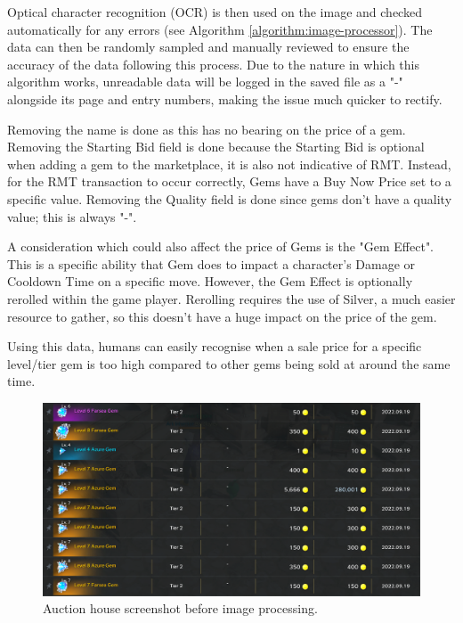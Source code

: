 \documentclass[journal]{IEEEtran}
\begin{document}
Optical character recognition (OCR) is then used on the image and checked automatically for any errors (see Algorithm \ref{algorithm:image-processor}). The data can then be randomly sampled and manually reviewed to ensure the accuracy of the data following this process. Due to the nature in which this algorithm works, unreadable data will be logged in the saved file as a "-" alongside its page and entry numbers, making the issue much quicker to rectify.

Removing the name is done as this has no bearing on the price of a gem. Removing the Starting Bid field is done because the Starting Bid is optional when adding a gem to the marketplace, it is also not indicative of RMT. Instead, for the RMT transaction to occur correctly, Gems have a Buy Now Price set to a specific value. Removing the Quality field is done since gems don't have a quality value; this is always "-".

A consideration which could also affect the price of Gems is the "Gem Effect". This is a specific ability that Gem does to impact a character's Damage or Cooldown Time on a specific move. However, the Gem Effect is optionally rerolled within the game player. Rerolling requires the use of Silver, a much easier resource to gather, so this doesn't have a huge impact on the price of the gem.

Using this data, humans can easily recognise when a sale price for a specific level/tier gem is too high compared to other gems being sold at around the same time.

\begin{figure}[H]
    \centering
    \includegraphics[scale=0.125]{auction-house-before}
    \caption{Auction house screenshot before image processing.}
    \label{figure:auction-house-before}
\end{figure}
\end{document}

